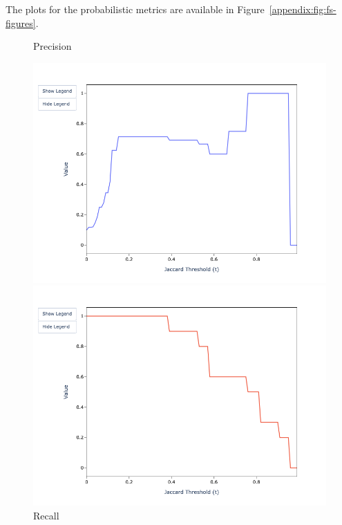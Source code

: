 \documentclass[a4paper,twoside]{article}
\begin{document}
    The plots for the probabilistic metrics are available in
    Figure~\ref{appendix:fig:fs-figures}.

    \begin{figure}[htbp]
        \begin{minipage}{0.32\textwidth}
            \centering
            \caption*{Precision}
            \includegraphics[width=\textwidth]{sample-usage/mini-fs-precision}
        \end{minipage}    
        \begin{minipage}{0.32\textwidth}
            \centering
            \caption*{Recall}
            \includegraphics[width=\textwidth]{sample-usage/mini-fs-recall}
        \end{minipage}    

\end{figure}
\end{document}
